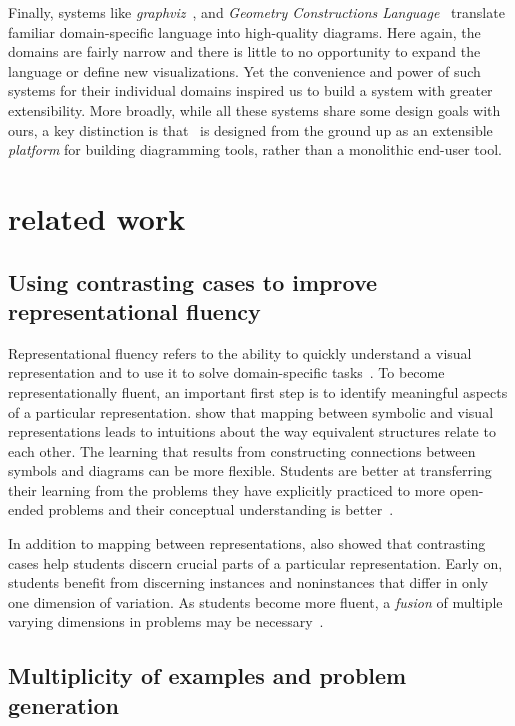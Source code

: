 Finally, systems like \emph{graphviz}~\cite{Graphviz}, and \emph{Geometry Constructions Language}~\cite{Janivcic:2006:GCLC} translate familiar domain-specific language into high-quality diagrams. Here again, the domains are fairly narrow and there is little to no opportunity to expand the language or define new visualizations.  Yet the convenience and power of such systems for their individual domains inspired us to build a system with greater extensibility. More broadly, while all these systems share some design goals with ours, a key distinction is that \Penrose\ is designed from the ground up as an extensible \emph{platform} for building diagramming tools, rather than a monolithic end-user tool.

\section{\Edgworth related work}
\label{sec:edgeworth-related}

\subsection{Using contrasting cases to improve representational fluency}

Representational fluency refers to the ability to quickly understand a visual representation and to use it to solve domain-specific tasks~\cite{multipleReps}. To become representationally fluent, an important first step is to identify meaningful aspects of a particular representation. \citet{perceptualLearning} show that mapping between symbolic and visual representations leads to intuitions about the way equivalent structures relate to each other. The learning that results from constructing connections between symbols and diagrams can be more flexible. Students are better at transferring their learning from the problems they have explicitly practiced to more open-ended problems and their conceptual understanding is better~\cite{25learning}. 

In addition to mapping between representations, \citet{samenessAndDifference} also showed that contrasting cases help students discern crucial parts of a particular representation. Early on, students benefit from discerning instances and noninstances that differ in only one dimension of variation. As students become more fluent, a \emph{fusion} of multiple varying dimensions in problems may be necessary~\cite{fusion}.

\subsection{Multiplicity of examples and problem generation}

